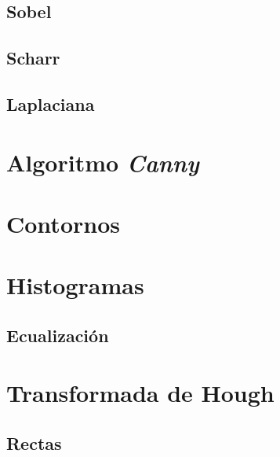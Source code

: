 \subsection{Sobel}
\subsection{Scharr}
\subsection{Laplaciana}

\section{Algoritmo \emph{Canny}}

\section{Contornos}

\section{Histogramas}
\subsection{Ecualización}

\section{Transformada de Hough}
\subsection{Rectas}